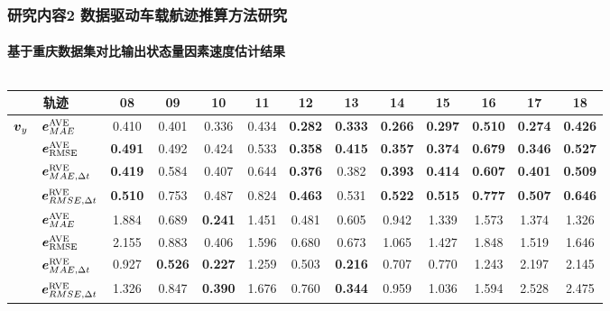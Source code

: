 \begin{frame} 
 	\frametitle{研究内容2 数据驱动车载航迹推算方法研究}
 	\framesubtitle{基于重庆数据集对比输出状态量因素速度估计结果}
	\vspace{-0.2cm}
	\begin{columns}[t]
		\begin{column}{0.6\textwidth}
			{   
				\tiny   
				\setlength{\tabcolsep}{2pt}     
				\begin{tabular*}{1.1\linewidth}{@{\extracolsep{\fill}}clccccccccccc}
					\toprule
					\multicolumn{2}{c}{轨迹} & 08 & 09 & 10 & 11 & 12 & 13 & 14 & 15 & 16 & 17 & 18 \\
					\midrule
					\multirow{4}{*}{$\vb*{v}_y$} 
					& $\vb*{e}^{\mathrm{AVE}}_{MAE}$ 
					& 0.410 & 0.401 & 0.336 & 0.434 & \textbf{0.282} & \textbf{0.333} & \textbf{0.266} & \textbf{0.297} & \textbf{0.510} & \textbf{0.274} & \textbf{0.426} \\         
					& $\vb*{e}^{\mathrm{AVE}}_{\mathrm{RMSE}}$          
					& \textbf{0.491} & 0.492 & 0.424 & 0.533 & \textbf{0.358} & \textbf{0.415} & \textbf{0.357} & \textbf{0.374} & \textbf{0.679} & \textbf{0.346} & \textbf{0.527} \\ 
					& $\vb*{e}^{\mathrm{RVE}}_{MAE, \Delta t}$ 
					& \textbf{0.419} & 0.584 & 0.407 & 0.644 & \textbf{0.376} & 0.382 & \textbf{0.393} & \textbf{0.414} & \textbf{0.607} & \textbf{0.401} & \textbf{0.509} \\
					& $\vb*{e}^{\mathrm{RVE}}_{RMSE,\Delta t}$ 
					& \textbf{0.510} & 0.753 & 0.487 & 0.824 & \textbf{0.463} & 0.531 & \textbf{0.522} & \textbf{0.515} & \textbf{0.777} & \textbf{0.507} & \textbf{0.646} \\ \addlinespace[1mm]
					\multirow{4}{*}{$\Delta\vb*{v}_y$} 
					& $\vb*{e}^{\mathrm{AVE}}_{MAE}$ 
					& 1.884 & 0.689 & \textbf{0.241} & 1.451 & 0.481 & 0.605 & 0.942 & 1.339 & 1.573 & 1.374 & 1.326 \\         
					& $\vb*{e}^{\mathrm{AVE}}_{\mathrm{RMSE}}$         
					& 2.155 & 0.883 & 0.406 & 1.596 & 0.680 & 0.673 & 1.065 & 1.427 & 1.848 & 1.519 & 1.646 \\
					& $\vb*{e}^{\mathrm{RVE}}_{MAE, \Delta t}$ 
					& 0.927 & \textbf{0.526} & \textbf{0.227} & 1.259 & 0.503 & \textbf{0.216} & 0.707 & 0.770 & 1.243 & 2.197 & 2.145 \\
					& $\vb*{e}^{\mathrm{RVE}}_{RMSE,\Delta t}$ 
					& 1.326 & 0.847 & \textbf{0.390} & 1.676 & 0.760 & \textbf{0.344} & 0.959 & 1.036 & 1.594 & 2.528 & 2.475 \\
					\bottomrule 

\end{tabular*}}
\end{column}
\end{columns}
\end{frame}
